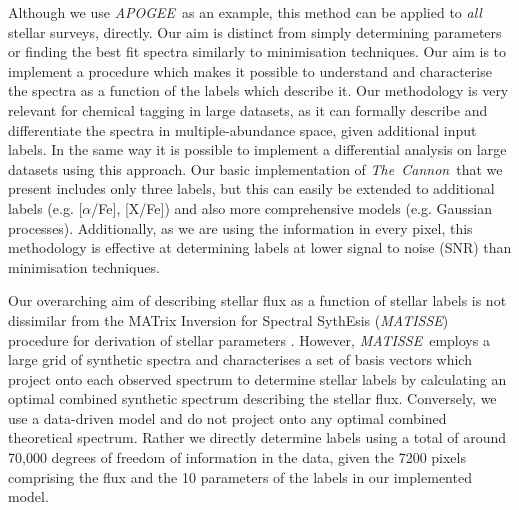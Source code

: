 \documentclass[12pt, preprint]{aastex}
\newcommand{\tc}{\textsl{The~Cannon}}
\newcommand{\apogee}{\textsl{APOGEE}}
\newcommand{\matisse}{\textsl{MATISSE}}
\begin{document}

Although we use \apogee\ as an example, this method can be applied to \textit{all} stellar surveys, directly.  Our aim is distinct from simply determining parameters or finding the best fit spectra similarly to minimisation techniques. Our aim is to implement a procedure which makes it possible to understand and characterise the spectra as a function of the labels which describe it.  Our methodology is very relevant for chemical tagging in large datasets, as it can formally describe and differentiate the spectra in multiple-abundance space, given additional input labels. In the same way it is possible to implement a differential analysis on large datasets using this approach. Our basic implementation of \tc\ that we present includes only three labels, but this can easily be extended to additional labels  (e.g. [$\alpha$/Fe], [X/Fe]) and also more comprehensive models (e.g. Gaussian processes). Additionally, as we are using the information in every pixel, this methodology is effective at determining labels at lower signal to noise (SNR) than minimisation techniques.%

Our overarching aim of describing stellar flux as a function of stellar labels is not dissimilar from the MATrix Inversion for Spectral SythEsis (\matisse) procedure for derivation of stellar parameters \citep{RB2006}. However, \matisse\ employs a large grid of synthetic spectra and characterises a set of basis vectors which project onto each observed spectrum to determine stellar labels by calculating an optimal combined synthetic spectrum describing the stellar flux. Conversely, we use a data-driven model and do not project onto any optimal combined theoretical spectrum. Rather we directly determine labels using a total of around 70,000 degrees of freedom of information in the data, given the 7200 pixels comprising the flux and the 10 parameters of the labels in our implemented model. 
\end{document}
